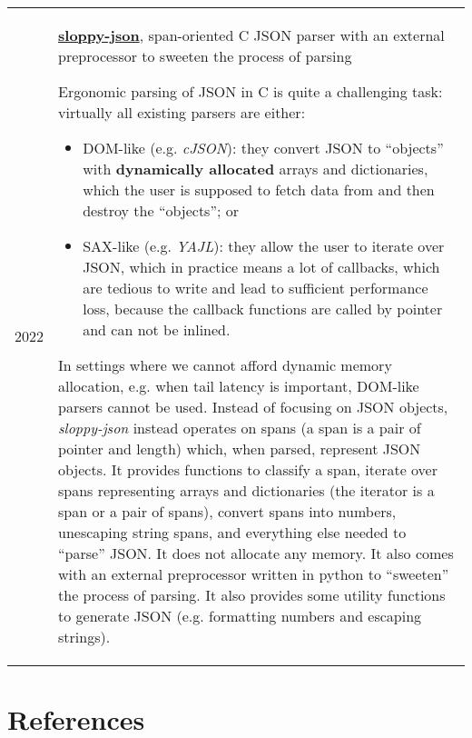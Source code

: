\documentclass[10pt]{article}
\begin{document}
\begin{tabularx}{\textwidth}{ l X }
    2022 & \href{https://github.com/shdown/sloppy-json}{\textbf{sloppy-json}}, span-oriented C JSON parser with an external preprocessor to sweeten the process of parsing
    \newline
    \footnotesize{
        Ergonomic parsing of JSON in C is quite a challenging task: virtually all existing parsers are either:
        \begin{itemize}
            \item DOM-like (e.g. \textit{cJSON}): they convert JSON to ``objects'' with \textbf{dynamically allocated} arrays and dictionaries, which the user is supposed to fetch data from and then destroy the ``objects''; or
            \item SAX-like (e.g. \textit{YAJL}): they allow the user to iterate over JSON, which in practice means a lot of callbacks, which are tedious to write and lead to sufficient performance loss, because the callback functions are called by pointer and can not be inlined.
        \end{itemize}
        In settings where we cannot afford dynamic memory allocation, e.g. when tail latency is important, DOM-like parsers cannot be used.
        Instead of focusing on JSON objects, \textit{sloppy-json} instead operates on spans (a span is a pair of pointer and length) which, when parsed, represent JSON objects.
        It provides functions to classify a span, iterate over spans representing arrays and dictionaries (the iterator is a span or a pair of spans), convert spans into numbers, unescaping string spans, and everything else needed to ``parse'' JSON.
        It does not allocate any memory.
        It also comes with an external preprocessor written in python to ``sweeten'' the process of parsing.
        It also provides some utility functions to generate JSON (e.g. formatting numbers and escaping strings).
    }
    \\
\end{tabularx}

\medskip

\section{References}
\end{document}
